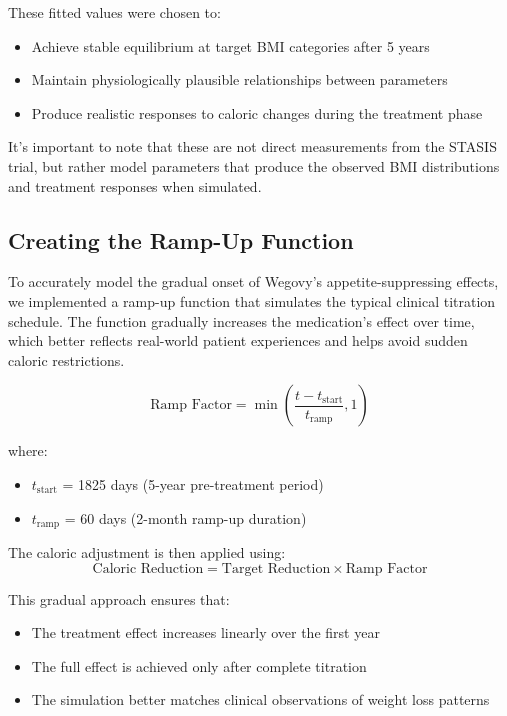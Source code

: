 These fitted values were chosen to:
\begin{itemize}
    \item Achieve stable equilibrium at target BMI categories after 5 years
    \item Maintain physiologically plausible relationships between parameters
    \item Produce realistic responses to caloric changes during the treatment phase
\end{itemize}

It's important to note that these are not direct measurements from the STASIS trial, but rather model parameters that produce the observed BMI distributions and treatment responses when simulated.

\subsection{Creating the Ramp-Up Function}
To accurately model the gradual onset of Wegovy's appetite-suppressing effects, we implemented a ramp-up function that simulates the typical clinical titration schedule. The function gradually increases the medication's effect over time, which better reflects real-world patient experiences and helps avoid sudden caloric restrictions.

\begin{equation}
    \text{Ramp Factor} = \min\left(\frac{t - t_{\text{start}}}{t_{\text{ramp}}}, 1\right)
\end{equation}

where:
\begin{itemize}
    \item $t_{\text{start}}$ = 1825 days (5-year pre-treatment period)
    \item $t_{\text{ramp}}$ = 60 days (2-month ramp-up duration)
\end{itemize}

The caloric adjustment is then applied using:
\begin{equation}
    \text{Caloric Reduction} = \text{Target Reduction} \times \text{Ramp Factor}
\end{equation}

This gradual approach ensures that:
\begin{itemize}
    \item The treatment effect increases linearly over the first year
    \item The full effect is achieved only after complete titration
    \item The simulation better matches clinical observations of weight loss patterns
\end{itemize}



